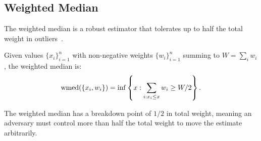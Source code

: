 \subsection{Weighted Median}

The weighted median is a robust estimator that tolerates up to half the total
weight in outliers~\cite{minsker2015geometric}.

\begin{definition}
Given values $\{x_i\}_{i=1}^n$ with non-negative weights $\{w_i\}_{i=1}^n$
summing to $W = \sum_i w_i$, the weighted median is:
\begin{equation}
    \operatorname{wmed}(\{x_i, w_i\}) = \inf\left\{x : \sum_{i: x_i \leq x} w_i \geq W/2\right\}.
\end{equation}
\end{definition}

The weighted median has a breakdown point of $1/2$ in total weight, meaning an
adversary must control more than half the total weight to move the estimate
arbitrarily.

